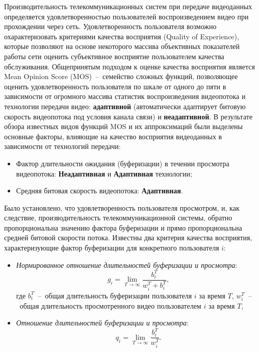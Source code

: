 Производительность телекоммуникационных систем при передаче видеоданных определяется удовлетворенностью пользователей воспроизведением видео при прохождении через сеть. Удовлетворенность пользователя возможно охарактеризовать критериями качества восприятия (Quality of Experience), которые позволяют на основе некоторого массива объективных показателей работы сети оценить субъективное восприятие пользователем качества обслуживания. Общепринятым подходом к оценке качества восприятия является Mean Opinion Score (MOS)~--~семейство сложных функций, позволяющее оценить удовлетворенность пользователя по шкале от одного до пяти в зависимости от огромного массива статистик воспроизведения видеопотока и технологии передачи видео: \textbf{адаптивной} (автоматически адаптирует битовую скорость видеопотока под условия канала связи) и \textbf{неадаптивной}.
В результате обзора известных видов функций MOS и их аппроксимаций были выделены основные факторы, влияющие на качество восприятия видеоданных в зависимости от технологий передачи:
\begin{itemize}
	\item Фактор длительности ожидания (буферизации) в течении просмотра видеопотока: \textbf{Неадаптивная} и \textbf{Адаптивная} технологии;
	\item Средняя битовая скорость видеопотока: \textbf{Адаптивная}.
\end{itemize}
Было установлено, что удовлетворенность пользователя просмотром, и, как следствие, производительность телекоммуникационной системы, обратно пропорциональна значению фактора буферизации и прямо пропорциональна средней битовой скорости потока. Известны два критерия качества восприятия, характеризующие фактор буферизации для конкретного пользователя $i$:
\begin{itemize}
	\item \textit{Нормированное отношение длительностей буферизации и просмотра}:
	\begin{equation}
    	\label{eq:g_def}
    	g_i = \lim\limits_{T\rightarrow\infty} \frac{b_i^T}{w_i^T + b_i^T},
    \end{equation}
    где $b_i^T$~--~общая длительность буферизации пользователя $i$ за время $T$, $w_i^T$~--~общая длительность просмотренного видео пользователем $i$ за время $T$,
	\item \textit{Отношение длительностей буферизации и просмотра}:
	\begin{equation}
    	\label{eq:q_def}
    	q_i = \lim\limits_{T\rightarrow\infty} \frac{b_i^T}{w_i^T}.
    \end{equation}
\end{itemize}

